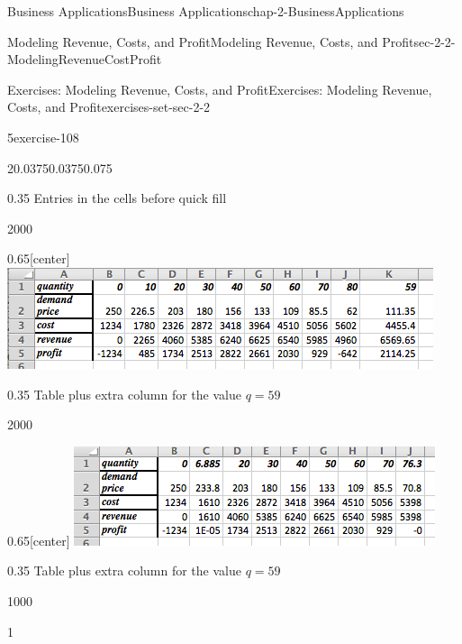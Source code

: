 \documentclass[oneside,10pt,]{book}
\numberwithin{equation}{section}
\begin{document}
\begin{chapterptx}{Business Applications}{}{Business Applications}{}{}{chap-2-BusinessApplications}
\begin{sectionptx}{Modeling Revenue, Costs, and Profit}{}{Modeling Revenue, Costs, and Profit}{}{}{sec-2-2-ModelingRevenueCostProfit}
\begin{exercises-subsection-numberless}{Exercises: Modeling Revenue, Costs, and Profit}{}{Exercises: Modeling Revenue, Costs, and Profit}{}{}{exercises-set-sec-2-2}
\begin{exercisegroup}
\begin{divisionexerciseeg}{5}{}{}{exercise-108}
\begin{enumerate}[label=(\alph*)]
\begin{sidebyside}{2}{0.0375}{0.0375}{0.075}
\begin{sbspanel}{0.35}
Entries in the cells before quick fill%
\end{sbspanel}%
\end{sidebyside}%
\begin{sidebyside}{2}{0}{0}{0}%
\begin{sbspanel}{0.65}[center]%
\includegraphics[width=1\linewidth]{images/sec2-2-sol3b.png}
\end{sbspanel}%
\begin{sbspanel}{0.35}%
\hypertarget{p-725}{}%
Table plus extra column for the value \(q = 59\)%
\end{sbspanel}%
\end{sidebyside}%
\begin{sidebyside}{2}{0}{0}{0}%
\begin{sbspanel}{0.65}[center]%
\includegraphics[width=1\linewidth]{images/sec2-2-sol3c.png}
\end{sbspanel}%
\begin{sbspanel}{0.35}%
\hypertarget{p-726}{}%
Table plus extra column for the value \(q = 59\)%
\end{sbspanel}%
\end{sidebyside}%
\begin{sidebyside}{1}{0}{0}{0}%
\begin{sbspanel}{1}%

\end{sbspanel}
\end{sidebyside}
\end{enumerate}
\end{divisionexerciseeg}
\end{exercisegroup}
\end{exercises-subsection-numberless}
\end{sectionptx}
\end{chapterptx}
\end{document}
